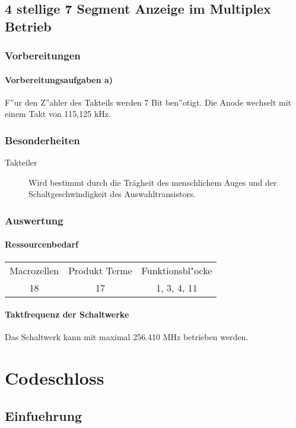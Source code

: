 \documentclass [] {scrartcl}
\begin{document}
  \subsection{4 stellige 7 Segment Anzeige im Multiplex Betrieb}
  \subsubsection{Vorbereitungen}
  \paragraph{Vorbereitungsaufgaben a)}
  F''ur den Z''ahler des Takteils werden 7 Bit ben''otigt. Die Anode wechselt mit einem Takt von 115,125 kHz.
  \subsubsection{Besonderheiten}
  \begin{description}
    \item[Takteiler] Wird bestimmt durch die Trägheit des menschlichem Auges und der Schaltgeschwindigkeit des Auswahltransistors.
  \end{description}
  \subsubsection{Auswertung}
  \paragraph{Ressourcenbedarf}
  \begin{table}
    \begin{tabular}{ccc}
      Macrozellen & Produkt Terme & Funktionsbl"ocke\\
      18 & 17 & 1, 3, 4, 11\\
    \end{tabular}
  \end{table}
  \paragraph{Taktfrequenz der Schaltwerke}
  Das Schaltwerk kann mit maximal 256.410 MHz betrieben werden.

  \section{Codeschloss}
  \subsection{Einfuehrung}
\end{document}
